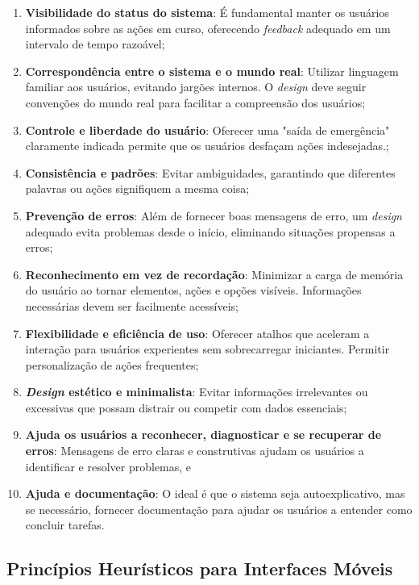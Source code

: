 \begin{enumerate}
    \item \textbf{Visibilidade do status do sistema}: É fundamental manter os usuários informados sobre as ações em curso, oferecendo \textit{feedback} adequado em um intervalo de tempo razoável;
    \item \textbf{Correspondência entre o sistema e o mundo real}: Utilizar linguagem familiar aos usuários, evitando jargões internos. O \textit{design} deve seguir convenções do mundo real para facilitar a compreensão dos usuários;
    \item \textbf{Controle e liberdade do usuário}: Oferecer uma "saída de emergência" claramente indicada permite que os usuários desfaçam ações indesejadas.;
    \item \textbf{Consistência e padrões}: Evitar ambiguidades, garantindo que diferentes palavras ou ações signifiquem a mesma coisa;
    \item \textbf{Prevenção de erros}: Além de fornecer boas mensagens de erro, um \textit{design} adequado evita problemas desde o início, eliminando situações propensas a erros;
    \item \textbf{Reconhecimento em vez de recordação}: Minimizar a carga de memória do usuário ao tornar elementos, ações e opções visíveis. Informações necessárias devem ser facilmente acessíveis;
    \item \textbf{Flexibilidade e eficiência de uso}: Oferecer atalhos que aceleram a interação para usuários experientes sem sobrecarregar iniciantes. Permitir personalização de ações frequentes;
    \item \textbf{\textit{Design} estético e minimalista}: Evitar informações irrelevantes ou excessivas que possam distrair ou competir com dados essenciais;
    \item \textbf{Ajuda os usuários a reconhecer, diagnosticar e se recuperar de erros}: Mensagens de erro claras e construtivas ajudam os usuários a identificar e resolver problemas, e
    \item \textbf{Ajuda e documentação}: O ideal é que o sistema seja autoexplicativo, mas se necessário, fornecer documentação para ajudar os usuários a entender como concluir tarefas.
\end{enumerate}

\subsection{Princípios Heurísticos para Interfaces Móveis}
    \label{HeuristicasMoveis}

